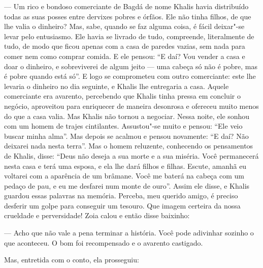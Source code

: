 --- Um rico e bondoso comerciante de Bagdá de nome Khalis havia
distribuído todas as suas posses entre dervixes pobres e órfãos. Ele não
tinha filhos, de que lhe valia o dinheiro? Mas, sabe, quando se faz
alguma coisa, é fácil deixar"-se levar pelo entusiasmo. Ele havia se
livrado de tudo, compreende, literalmente de tudo, de modo que ficou
apenas com a casa de paredes vazias, sem nada para comer nem como
comprar comida. E ele pensou: ``E daí? Vou vender a casa e doar o
dinheiro, e sobreviverei de algum jeito --- uma cabeça só não é pobre,
mas é pobre quando está só''. E logo se comprometeu com outro
comerciante: este lhe levaria o dinheiro no dia seguinte, e Khalis lhe
entregaria a casa. Aquele comerciante era avarento, percebendo que
Khalis tinha pressa em concluir o negócio, aproveitou para enriquecer de
maneira desonrosa e ofereceu muito menos do que a casa valia. Mas Khalis
não tornou a negociar. Nessa noite, ele sonhou com um homem de trajes
cintilantes. Assustou"-se muito e pensou: ``Ele veio buscar minha alma''.
Mas depois se acalmou e pensou novamente: ``E daí? Não deixarei nada
nesta terra''. Mas o homem reluzente, conhecendo os pensamentos de
Khalis, disse: ``Deus não deseja a sua morte e a sua miséria. Você
permanecerá nesta casa e terá uma esposa, e ela lhe dará filhos e
filhas. Escute, amanhã eu voltarei com a aparência de um brâmane. Você
me baterá na cabeça com um pedaço de pau, e eu me desfarei num monte de
ouro''. Assim ele disse, e Khalis guardou essas palavras na memória.
Perceba, meu querido amigo, é preciso desferir um golpe para conseguir
um tesouro. Que imagem certeira da nossa crueldade e perversidade! Zoia
calou e então disse baixinho:

--- Acho que não vale a pena terminar a história. Você pode adivinhar
sozinho o que aconteceu. O bom foi recompensado e o avarento castigado.

Mas, entretida com o conto, ela prosseguiu:

